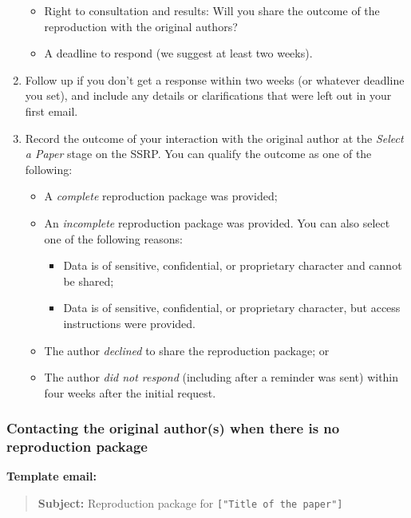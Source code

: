 \begin{enumerate}
\begin{itemize}
        \item Right to consultation and results: Will you share the outcome of the reproduction with the original authors?
        \item A deadline to respond (we suggest at least two weeks).
    \end{itemize}
    \item Follow up if you don’t get a response within two weeks (or whatever deadline you set), and include any details or clarifications that were left out in your first email.
    \item Record the outcome of your interaction with the original author at the \textit{Select a Paper} stage on the SSRP. You can qualify the outcome as one of the following:
    \begin{itemize}
        \item A \textit{complete} reproduction package was provided;
        \item An \textit{incomplete} reproduction package was provided. You can also
    select one of the following reasons:
        \begin{itemize}
            \item Data is of sensitive, confidential, or proprietary character and cannot be shared;
            \item Data is of sensitive, confidential, or proprietary character, but access instructions were provided.
        \end{itemize}
    \item The author \textit{declined} to share the reproduction package; or
    \item The author \textit{did not respond} (including after a reminder was sent) within four weeks after the initial request.
    \end{itemize}
\end{enumerate}

\subsubsection{Contacting the original author(s) when there is no reproduction package}

\textbf{Template email:}

\begin{quote}
\textbf{Subject:} Reproduction package for
\texttt{{[}"Title\ of\ the\ paper"{]}}
\end{quote}

